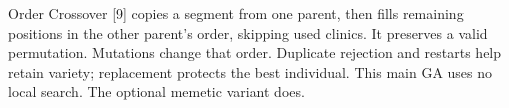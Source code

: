 Order Crossover [9] copies a segment from one parent, then fills remaining positions in the other
parent's order, skipping used clinics. It preserves a valid permutation. Mutations change that
order. Duplicate rejection and restarts help retain variety; replacement protects the best
individual. This main GA uses no local search. The optional memetic variant does.
